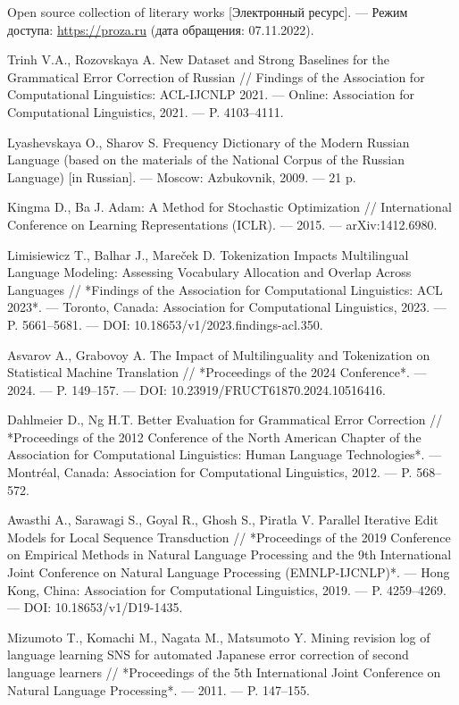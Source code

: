 \begin{thebibliography}{99}
Open source collection of literary works [Электронный ресурс]. — Режим доступа: \url{https://proza.ru} (дата обращения: 07.11.2022).

Trinh V.A., Rozovskaya A. New Dataset and Strong Baselines for the Grammatical Error Correction of Russian // Findings of the Association for Computational Linguistics: ACL-IJCNLP 2021. — Online: Association for Computational Linguistics, 2021. — P. 4103–4111.

Lyashevskaya O., Sharov S. Frequency Dictionary of the Modern Russian Language (based on the materials of the National Corpus of the Russian Language) [in Russian]. — Moscow: Azbukovnik, 2009. — 21 p.

Kingma D., Ba J.  
Adam: A Method for Stochastic Optimization // International Conference on Learning Representations (ICLR). — 2015. — arXiv:1412.6980.

Limisiewicz T., Balhar J., Mareček D.  
Tokenization Impacts Multilingual Language Modeling: Assessing Vocabulary Allocation and Overlap Across Languages // *Findings of the Association for Computational Linguistics: ACL 2023*. — Toronto, Canada: Association for Computational Linguistics, 2023. — P. 5661–5681. — DOI: 10.18653/v1/2023.findings-acl.350.

Asvarov A., Grabovoy A.  
The Impact of Multilinguality and Tokenization on Statistical Machine Translation // *Proceedings of the 2024 Conference*. — 2024. — P. 149–157. — DOI: 10.23919/FRUCT61870.2024.10516416.

Dahlmeier D., Ng H.T.  
Better Evaluation for Grammatical Error Correction // *Proceedings of the 2012 Conference of the North American Chapter of the Association for Computational Linguistics: Human Language Technologies*. — Montréal, Canada: Association for Computational Linguistics, 2012. — P. 568–572.

Awasthi A., Sarawagi S., Goyal R., Ghosh S., Piratla V.  
Parallel Iterative Edit Models for Local Sequence Transduction // *Proceedings of the 2019 Conference on Empirical Methods in Natural Language Processing and the 9th International Joint Conference on Natural Language Processing (EMNLP-IJCNLP)*. — Hong Kong, China: Association for Computational Linguistics, 2019. — P. 4259–4269. — DOI: 10.18653/v1/D19-1435.

Mizumoto T., Komachi M., Nagata M., Matsumoto Y.  
Mining revision log of language learning SNS for automated Japanese error correction of second language learners // *Proceedings of the 5th International Joint Conference on Natural Language Processing*. — 2011. — P. 147–155.



\end{thebibliography}
